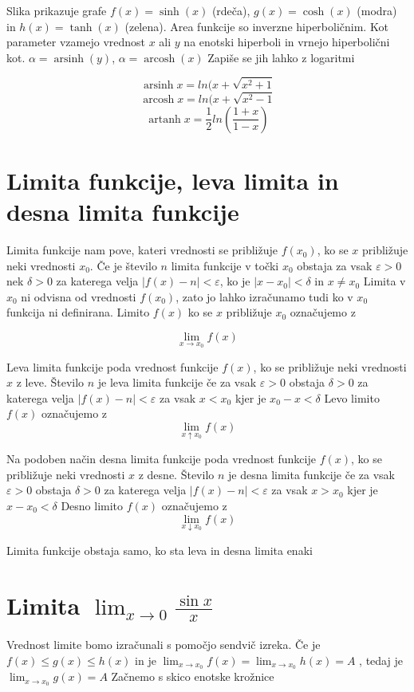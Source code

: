 \documentclass[12pt]{report}
\begin{document}
Slika prikazuje grafe $f(x)=\sinh(x)$ (rdeča), $g(x)=\cosh(x)$ (modra) in $h(x)=\tanh(x)$ (zelena).
\bigbreak
Area funkcije so inverzne hiperboličnim. Kot parameter vzamejo vrednost $x$ ali $y$ na enotski hiperboli in vrnejo hiperbolični kot. $\alpha=\operatorname{arsinh}(y)$, $\alpha=\operatorname{arcosh}(x)$
\bigbreak
Zapiše se jih lahko z logaritmi

 \[\operatorname{arsinh} x= ln(x+\sqrt{x^2+1}\]
 \[ \operatorname{arcosh}  x=ln(x+\sqrt{x^2-1}\]
 \[\operatorname{artanh} x= \frac{1}{2}ln(\frac{1+x}{1-x})\]
 


\section*{Limita funkcije, leva limita in desna limita funkcije}
Limita funkcije nam pove, kateri vrednosti se približuje $f(x_0)$, ko se $x$ približuje neki vrednosti $x_0$. Če je število $n$ limita funkcije v točki $x_0$ obstaja za vsak $\varepsilon>0$ nek $\delta>0$ za katerega velja $|f(x)-n|<\varepsilon$, ko je $|x-x_0|<\delta$ in $x\neq x_0$
\bigbreak
Limita v $x_0$ ni odvisna od vrednosti $f(x_0)$, zato jo lahko izračunamo tudi ko v $x_0$ funkcija ni definirana.
Limito $f(x)$ ko se $x$ približuje $x_0$ označujemo z  

\[\lim_{x \to x_0}f(x)\]

Leva limita funkcije poda vrednost funkcije $f(x)$, ko se približuje neki vrednosti $x$ z leve. Število $n$ je leva limita funkcije če za vsak $\varepsilon>0$ obstaja $\delta>0$ za katerega velja $|f(x)-n|<\varepsilon$ za vsak $x<x_0$ kjer je $x_0-x<\delta$
\bigbreak
Levo limito $f(x)$ označujemo z 
\[\lim_{x \uparrow x_0}f(x)\] 

Na podoben način desna limita funkcije poda vrednost funkcije $f(x)$, ko se približuje neki vrednosti $x$ z desne. Število $n$ je desna limita funkcije če za vsak $\varepsilon>0$ obstaja $\delta>0$ za katerega velja $|f(x)-n|<\varepsilon$ za vsak $x>x_0$ kjer je $x-x_0<\delta$
\bigbreak
Desno limito $f(x)$ označujemo z  
\[\lim_{x \downarrow x_0}f(x)\]

Limita funkcije obstaja samo, ko sta leva in desna limita enaki

\section*{Limita $\displaystyle \lim_{x \to 0}\frac{\sin x}{x}$}

Vrednost limite bomo izračunali s pomočjo sendvič izreka.
Če je $f(x)\leq g(x) \leq h(x)$ in je $\displaystyle \lim_{x \to x_0}f(x) = \lim_{x \to x_0}h(x) = A$ ,
 tedaj je $\displaystyle \lim_{x \to x_0}g(x)=A$
\bigbreak
Začnemo s skico enotske krožnice
 
\end{document}
